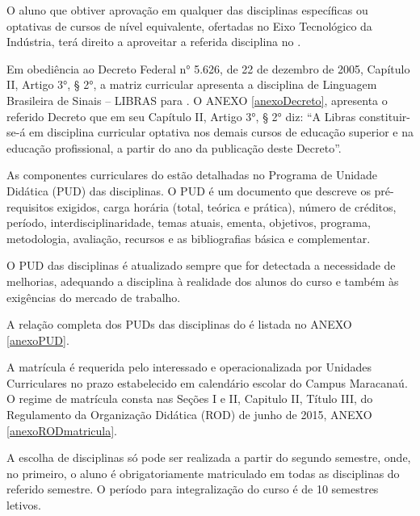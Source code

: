 \documentclass{paper}
\begin{document}
O aluno que obtiver aprovação em qualquer das disciplinas específicas ou optativas de cursos de nível equivalente, ofertadas no Eixo Tecnológico da Indústria, terá direito a aproveitar a referida disciplina no \NOMECURSO.

Em obediência ao Decreto Federal n° 5.626, de 22 de dezembro de 2005, Capítulo II, Artigo 3°, § 2°, a matriz curricular apresenta a disciplina de Linguagem Brasileira de Sinais – LIBRAS para \NOMECURSO. O ANEXO \ref{anexoDecreto}, apresenta o referido Decreto que em seu Capítulo II, Artigo 3°, § 2° diz: ``A Libras constituir-se-á em disciplina curricular optativa nos demais cursos de educação superior e na educação profissional, a partir do ano da publicação deste Decreto''.

As componentes curriculares do \NOMECURSO estão detalhadas no Programa de Unidade Didática (PUD) das disciplinas. O PUD é um documento que descreve os pré-requisitos exigidos, carga horária (total, teórica e prática), número de créditos, período, interdisciplinaridade, temas atuais, ementa, objetivos, programa, metodologia, avaliação, recursos e as bibliografias básica e complementar.

O PUD das disciplinas é atualizado sempre que for detectada a necessidade de melhorias, adequando a disciplina à realidade dos alunos do curso e também às exigências do mercado de trabalho.

A relação completa dos PUDs das disciplinas do \NOMECURSO é listada no ANEXO \ref{anexoPUD}.

A matrícula é requerida pelo interessado e operacionalizada por Unidades Curriculares no prazo estabelecido em calendário escolar do Campus Maracanaú. O regime de matrícula consta nas Seções I e II, Capitulo II, Título III, do Regulamento da Organização Didática (ROD) de junho de 2015, ANEXO \ref{anexoRODmatricula}.

A escolha de disciplinas só pode ser realizada a partir do segundo semestre, onde, no primeiro, o aluno é obrigatoriamente matriculado em todas as disciplinas do referido semestre. O período para integralização do curso é de 10 semestres letivos.


\if{}
\else
\fi
\end{document}
